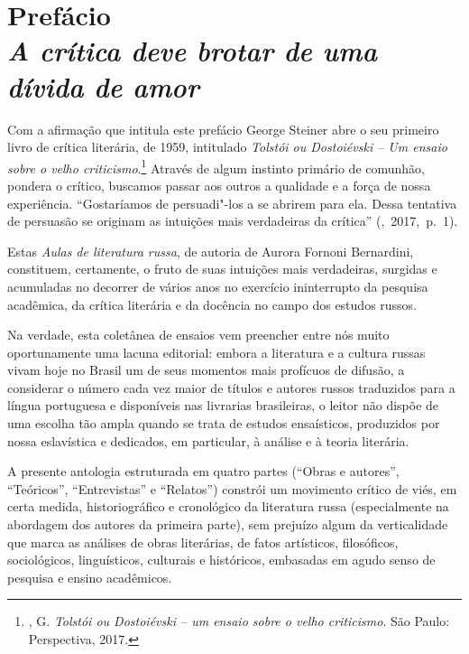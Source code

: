 \chapter*{Prefácio\\
\bigskip
{\large\emph{A crítica deve brotar de uma dívida de amor}}}
\label{prefacio}




Com a afirmação que intitula este prefácio George Steiner abre o seu primeiro livro de crítica
literária, de 1959, intitulado \emph{Tolstói ou Dostoiévski -- Um ensaio
sobre o velho criticismo}.\footnote{\scalebox{0.8}{STEINER}, G. \emph{Tolstói ou
  Dostoiévski -- um ensaio sobre o velho criticismo}. São Paulo:
  Perspectiva, 2017.} Através de algum instinto primário de comunhão,
pondera o crítico, buscamos passar aos outros a qualidade e a força de
nossa experiência. ``Gostaríamos de persuadi"-los a se abrirem para ela.
Dessa tentativa de persuasão se originam as intuições mais verdadeiras
da crítica'' (\scalebox{0.8}{STEINER},~2017,~p.~1).

Estas \emph{Aulas de literatura russa}, de autoria de Aurora Fornoni
Bernardini, constituem, certamente, o fruto de suas intuições mais
verdadeiras, surgidas e acumuladas no decorrer de vários anos no
exercício ininterrupto da pesquisa acadêmica, da crítica literária e da
docência no campo dos estudos russos.

Na verdade, esta coletânea de ensaios vem preencher entre nós muito
oportunamente uma lacuna editorial: embora a literatura e a cultura
russas vivam hoje no Brasil um de seus momentos mais profícuos de
difusão, a considerar o número cada vez maior de títulos e
autores russos traduzidos para a língua portuguesa e disponíveis nas
livrarias brasileiras, o leitor não dispõe de uma escolha
tão ampla quando se trata de estudos ensaísticos,
produzidos por nossa eslavística e dedicados, em particular, à análise e
à teoria literária.

A presente antologia estruturada em quatro partes (``Obras e
autores'', ``Teóricos'', ``Entrevistas'' e ``Relatos'') constrói um movimento crítico de viés,
em certa medida, historiográfico e cronológico da literatura russa
(especialmente na abordagem dos autores da primeira parte),
sem prejuízo algum da verticalidade que marca as análises de obras literárias, de fatos artísticos, filosóficos,
sociológicos, linguísticos, culturais e históricos, embasadas em agudo
senso de pesquisa e ensino acadêmicos.


